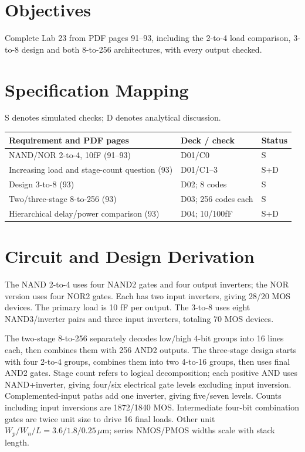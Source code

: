 \section{Objectives}
Complete Lab 23 from PDF pages 91--93, including the 2-to-4 load comparison, 3-to-8 design and both 8-to-256 architectures, with every output checked.

\section{Specification Mapping}
S denotes simulated checks; D denotes analytical discussion.

\small\begin{longtable}{p{.46\linewidth}p{.30\linewidth}p{.15\linewidth}}\toprule
Requirement and PDF pages & Deck / check & Status \\ \midrule\endhead
NAND/NOR 2-to-4, 10fF (91--93) & D01/C0 & S \\
Increasing load and stage-count question (93) & D01/C1--3 & S+D \\
Design 3-to-8 (93) & D02; 8 codes & S \\
Two/three-stage 8-to-256 (93) & D03; 256 codes each & S \\
Hierarchical delay/power comparison (93) & D04; 10/100fF & S+D \\
\bottomrule\end{longtable}\normalsize


\section{Circuit and Design Derivation}
The NAND 2-to-4 uses four NAND2 gates and four output inverters; the NOR version uses four NOR2 gates. Each has two input inverters, giving 28/20 MOS devices. The primary load is 10 fF per output. The 3-to-8 uses eight NAND3/inverter pairs and three input inverters, totaling 70 MOS devices.

The two-stage 8-to-256 separately decodes low/high 4-bit groups into 16 lines each, then combines them with 256 AND2 outputs. The three-stage design starts with four 2-to-4 groups, combines them into two 4-to-16 groups, then uses final AND2 gates. Stage count refers to logical decomposition; each positive AND uses NAND+inverter, giving four/six electrical gate levels excluding input inversion. Complemented-input paths add one inverter, giving five/seven levels. Counts including input inversions are 1872/1840 MOS. Intermediate four-bit combination gates are twice unit size to drive 16 final loads. Other unit $W_p/W_n/L=3.6/1.8/0.25\,\mu$m; series NMOS/PMOS widths scale with stack length.

